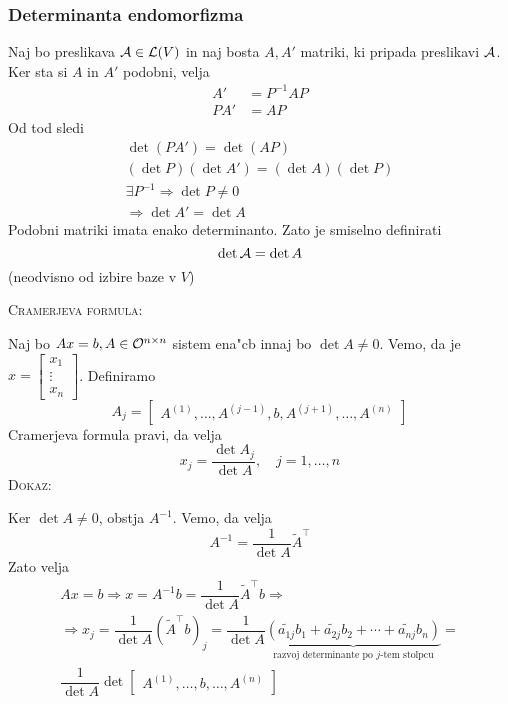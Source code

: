 \subsubsection{Determinanta endomorfizma}
Naj bo preslikava $\mathcal{A} \in \mathcal{L}(V)$ in naj bosta $A, A'$ matriki, ki pripada preslikavi $\mathcal{A}$. Ker sta si $A$ in $A'$ podobni, velja
\begin{align*}
A' &= P^{-1} AP \\
P A' &= AP
\end{align*}
Od tod sledi
\begin{gather*}
\det (PA') = \det (AP) \\
(\det P) (\det A') = (\det A) (\det P) \\
\exists P^{-1} \Rightarrow \det P \neq 0 \\
\Rightarrow \det A' = \det A
\end{gather*}
Podobni matriki imata enako determinanto. Zato je smiselno definirati
\begin{equation*}
\det \mathcal{A} = \det A
\end{equation*}
(neodvisno od izbire baze v $V$)

\textsc{Cramerjeva formula:}

Naj bo $Ax = b, A \in \mathcal{O}^{n \times n}$ sistem ena"cb innaj bo $\det A \neq 0$. Vemo, da je $x = \begin{bmatrix}x_1 \\ \vdots \\ x_n\end{bmatrix}$. Definiramo
\begin{equation*}
A_j = \begin{bmatrix}A^{(1)}, \ldots, A^{(j-1)}, b, A^{(j+1)}, \ldots, A^{(n)}\end{bmatrix}
\end{equation*}
Cramerjeva formula pravi, da velja
\begin{equation*}
x_j = \dfrac{\det A_j}{\det A}, \quad j = 1, \ldots, n
\end{equation*}
\textsc{Dokaz:}

Ker $\det A \neq 0$, obstja $A^{-1}$. Vemo, da velja
\begin{equation*}
A^{-1} = \dfrac{1}{\det A} \widetilde{A}^\intercal
\end{equation*}
Zato velja
\begin{gather*}
Ax = b \Rightarrow x = A^{-1} b = \dfrac{1}{\det A} \widetilde{A}^\intercal b \Rightarrow \\
\Rightarrow x_j = \dfrac{1}{\det A} \left( \widetilde{A}^\intercal b \right)_j = \dfrac{1}{\det A} \underbrace{(\widetilde{a_{1j}} b_1 + \widetilde{a_{2j}} b_2 + \cdots + \widetilde{a_{nj}} b_n)}_\text{razvoj determinante po $j$-tem stolpcu} = \\
\dfrac{1}{\det A} \det \begin{bmatrix}
A^{(1)}, \ldots, b, \ldots, A^{(n)}
\end{bmatrix}
\end{gather*}

